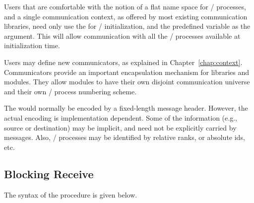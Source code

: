 \begin{users}
Users that are comfortable with the notion of a flat name space for
\MPI/ processes, and a single communication context, as offered by most
existing communication libraries, need only use the \wpm{} for \MPI/ initialization, and the predefined
variable  as the  argument.
This will allow communication with all the \MPI/ processes available at
initialization time.

Users may define new communicators, as explained in Chapter~\ref{chap:context}.
Communicators provide an important encapsulation mechanism for libraries and
modules.  They allow modules to have their own disjoint communication universe
and their own \MPI/ process numbering scheme.
\end{users}

\begin{implementors}
The 
would normally be encoded by a fixed-length message header.
However, the actual encoding
is implementation dependent. Some of the information (e.g.,
source or destination) may be implicit, and need not be
explicitly carried by messages. Also, \MPI/ processes may be identified by
relative ranks, or absolute ids, etc.
\end{implementors}

\subsection{Blocking Receive}
\label{subsec:pt2pt-basicreceive}

The syntax of the  procedure is given below.

